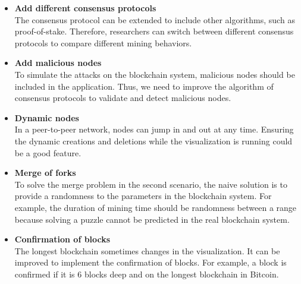 \begin{itemize}
    \item \textbf{Add different consensus protocols} \\
        The consensus protocol can be extended to include other algorithms, such as proof-of-stake. Therefore, researchers can switch between different consensus protocols to compare different mining behaviors.
    \item \textbf{Add malicious nodes} \\
        To simulate the attacks on the blockchain system, malicious nodes should be included in the application. Thus, we need to improve the algorithm of consensus protocols to validate and detect malicious nodes.
    \item \textbf{Dynamic nodes} \\
        In a peer-to-peer network, nodes can jump in and out at any time. Ensuring the dynamic creations and deletions while the visualization is running could be a good feature.
    \item \textbf{Merge of forks} \\
        To solve the merge problem in the second scenario, the naive solution is to provide a randomness to the parameters in the blockchain system. For example, the duration of mining time should be randomness between a range because solving a puzzle cannot be predicted in the real blockchain system.
    \item \textbf{Confirmation of blocks} \\
        The longest blockchain sometimes changes in the visualization. It can be improved to implement the confirmation of blocks. For example, a block is confirmed if it is 6 blocks deep and on the longest blockchain in Bitcoin.
\end{itemize}
